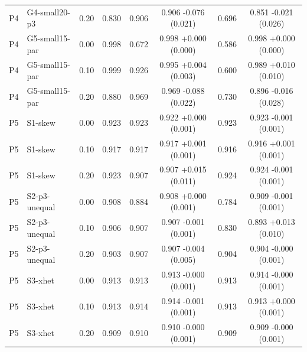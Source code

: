 {\begin{longtable}{llcccccc}
P4 & G4-small20-p3 & 0.20 & 0.830 & 0.906 & 0.906 -0.076 (0.021) & 0.696 & 0.851 -0.021 (0.026) \\
P4 & G5-small15-par & 0.00 & 0.998 & 0.672 & 0.998 +0.000 (0.000) & 0.586 & 0.998 +0.000 (0.000) \\
P4 & G5-small15-par & 0.10 & 0.999 & 0.926 & 0.995 +0.004 (0.003) & 0.600 & 0.989 +0.010 (0.010) \\
P4 & G5-small15-par & 0.20 & 0.880 & 0.969 & 0.969 -0.088 (0.022) & 0.730 & 0.896 -0.016 (0.028) \\
P5 & S1-skew & 0.00 & 0.923 & 0.923 & 0.922 +0.000 (0.001) & 0.923 & 0.923 -0.001 (0.001) \\
P5 & S1-skew & 0.10 & 0.917 & 0.917 & 0.917 +0.001 (0.001) & 0.916 & 0.916 +0.001 (0.001) \\
P5 & S1-skew & 0.20 & 0.923 & 0.907 & 0.907 +0.015 (0.011) & 0.924 & 0.924 -0.001 (0.001) \\
P5 & S2-p3-unequal & 0.00 & 0.908 & 0.884 & 0.908 +0.000 (0.001) & 0.784 & 0.909 -0.001 (0.001) \\
P5 & S2-p3-unequal & 0.10 & 0.906 & 0.907 & 0.907 -0.001 (0.001) & 0.830 & 0.893 +0.013 (0.010) \\
P5 & S2-p3-unequal & 0.20 & 0.903 & 0.907 & 0.907 -0.004 (0.005) & 0.904 & 0.904 -0.000 (0.001) \\
P5 & S3-xhet & 0.00 & 0.913 & 0.913 & 0.913 -0.000 (0.001) & 0.913 & 0.914 -0.000 (0.001) \\
P5 & S3-xhet & 0.10 & 0.913 & 0.914 & 0.914 -0.001 (0.001) & 0.913 & 0.913 +0.000 (0.001) \\
P5 & S3-xhet & 0.20 & 0.909 & 0.910 & 0.910 -0.000 (0.001) & 0.909 & 0.909 -0.000 (0.001) \\
\bottomrule
\end{longtable}
}